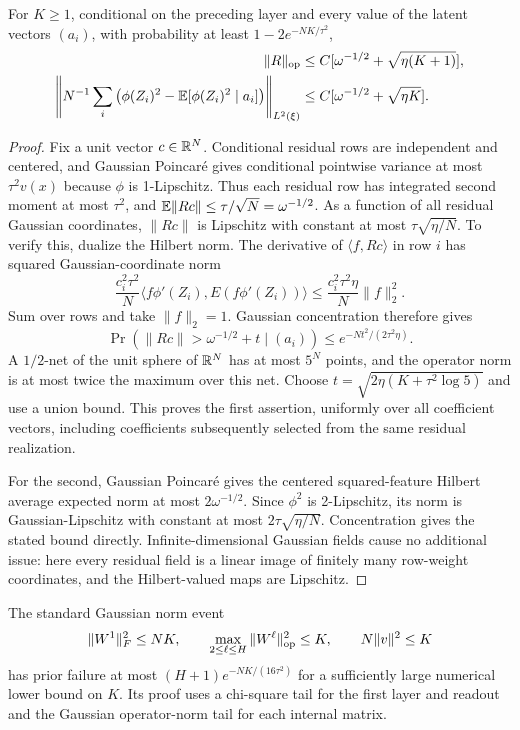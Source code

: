 \begin{lemma}
\label{lem:direct-residual}
For $K\ge1$, conditional on the preceding layer and every value of the latent vectors $(a_i)$, with probability at least $1-2e^{-NK/\tau^2}$,
\begin{align}
 \|R\|_{\mathrm{op}}&\le C[\omega^{-1/2}+\sqrt{\eta(K+1)}],\notag\\
 \left\|N^{-1}\sum_i\left(\phi(Z_i)^2-\mathbb E[\phi(Z_i)^2\mid a_i]\right)\right\|_{L^2(\xi)}
 &\le C[\omega^{-1/2}+\sqrt{\eta K}].
 \label{eq:direct-residual}
\end{align}
\end{lemma}
\begin{proof}
Fix a unit vector $c\in\mathbb R^N$. Conditional residual rows are independent and centered, and Gaussian Poincar\'e gives conditional pointwise variance at most $\tau^2v(x)$ because $\phi$ is 1-Lipschitz. Thus each residual row has integrated second moment at most $\tau^2$, and $\mathbb E\|Rc\|\le\tau/\sqrt N=\omega^{-1/2}$. As a function of all residual Gaussian coordinates, $\|Rc\|$ is Lipschitz with constant at most $\tau\sqrt{\eta/N}$. To verify this, dualize the Hilbert norm. The derivative of $\langle f,Rc\rangle$ in row $i$ has squared Gaussian-coordinate norm
\[
 \frac{c_i^2\tau^2}{N}
 \langle f\phi'(Z_i),E(f\phi'(Z_i))\rangle
 \le\frac{c_i^2\tau^2\eta}{N}\|f\|_2^2.
\]
Sum over rows and take $\|f\|_2=1$. Gaussian concentration therefore gives
\[
 \Pr(\|Rc\|>\omega^{-1/2}+t\mid(a_i))
 \le e^{-Nt^2/(2\tau^2\eta)}.
\]
A $1/2$-net of the unit sphere of $\mathbb R^N$ has at most $5^N$ points, and the operator norm is at most twice the maximum over this net. Choose $t=\sqrt{2\eta(K+\tau^2\log5)}$ and use a union bound. This proves the first assertion, uniformly over all coefficient vectors, including coefficients subsequently selected from the same residual realization.

For the second, Gaussian Poincar\'e gives the centered squared-feature Hilbert average expected norm at most $2\omega^{-1/2}$. Since $\phi^2$ is 2-Lipschitz, its norm is Gaussian-Lipschitz with constant at most $2\tau\sqrt{\eta/N}$. Concentration gives the stated bound directly. Infinite-dimensional Gaussian fields cause no additional issue: here every residual field is a linear image of finitely many row-weight coordinates, and the Hilbert-valued maps are Lipschitz.
\end{proof}

The standard Gaussian norm event
\begin{equation}
 \|W^1\|_F^2\le NK,\qquad
 \max_{2\le\ell\le H}\|W^\ell\|_{\mathrm{op}}^2\le K,\qquad
 N\|v\|^2\le K
 \label{eq:norm-event}
\end{equation}
has prior failure at most $(H+1)e^{-NK/(16\tau^2)}$ for a sufficiently large numerical lower bound on $K$. Its proof uses a chi-square tail for the first layer and readout and the Gaussian operator-norm tail for each internal matrix.

